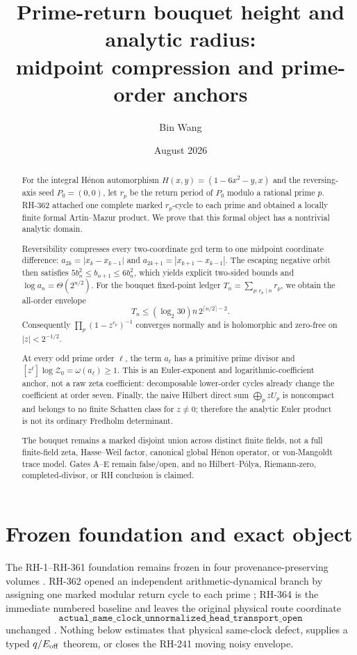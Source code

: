 \documentclass[11pt]{article}
\title{Prime-return bouquet height and analytic radius:\\
midpoint compression and prime-order anchors}
\author{Bin Wang}
\date{August 2026}
\numberwithin{equation}{section}
\theoremstyle{remark}
\begin{document}
\maketitle

\begin{abstract}
For the integral H\'enon automorphism
\(
H(x,y)=(1-6x^2-y,x)
\)
and the reversing-axis seed \(P_0=(0,0)\), let \(r_p\) be the return period
of \(P_0\) modulo a rational prime \(p\).  RH-362 attached one complete
marked \(r_p\)-cycle to each prime and obtained a locally finite formal
Artin--Mazur product.  We prove that this formal object has a nontrivial
analytic domain.

Reversibility compresses every two-coordinate gcd term to one midpoint
coordinate difference:
\(
a_{2k}=|x_k-x_{k-1}|
\)
and
\(
a_{2k+1}=|x_{k+1}-x_{k-1}|
\).
The escaping negative orbit then satisfies
\(
5b_n^2\le b_{n+1}\le6b_n^2
\),
which yields explicit two-sided bounds and
\(
\log a_n=\Theta(2^{n/2})
\).
For the bouquet fixed-point ledger
\(
T_n=\sum_{p:r_p\mid n}r_p
\),
we obtain the all-order envelope
\[
 T_n\le(\log_2 30)n\,2^{\lceil n/2\rceil-2}.
\]
Consequently
\(
\prod_p(1-z^{r_p})^{-1}
\)
converges normally and is holomorphic and zero-free on
\(
|z|<2^{-1/2}
\).

At every odd prime order \(\ell\), the term \(a_\ell\) has a primitive prime
divisor and
\(
[z^\ell]\log\mathcal Z_0=\omega(a_\ell)\ge1
\).
This is an Euler-exponent and logarithmic-coefficient anchor, not a raw zeta
coefficient: decomposable lower-order cycles already change the coefficient
at order seven.  Finally, the naive Hilbert direct sum
\(
\bigoplus_p zU_p
\)
is noncompact and belongs to no finite Schatten class for \(z\ne0\);
therefore the analytic Euler product is not its ordinary Fredholm
determinant.

The bouquet remains a marked disjoint union across distinct finite fields,
not a full finite-field zeta, Hasse--Weil factor, canonical global H\'enon
operator, or von-Mangoldt trace model.  Gates A--E remain false/open, and no
Hilbert--P\'olya, Riemann-zero, completed-divisor, or RH conclusion is
claimed.
\end{abstract}

\section{Frozen foundation and exact object}

The RH-1--RH-361 foundation remains frozen in four provenance-preserving
volumes \citep{WangRHCorpus2026}.  RH-362 opened an independent
arithmetic-dynamical branch by assigning one marked modular return cycle to
each prime \citep{WangRH3622026}; RH-364 is the immediate numbered baseline
and leaves the original physical route coordinate
\begin{equation}
 \texttt{actual\_same\_clock\_unnormalized\_head\_transport\_open}
 \label{eq:physical-coordinate}
\end{equation}
unchanged \citep{WangRH3642026}.  Nothing below estimates that physical
same-clock defect, supplies a typed \(q/E_{\rm off}\) theorem, or closes the
RH-241 moving noisy envelope.
\end{document}
